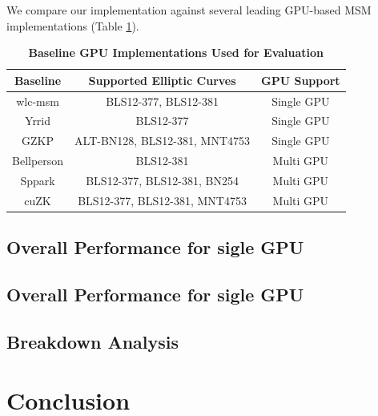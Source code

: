 \documentclass[journal=tches,final]{iacrtrans}
\begin{document}
We compare our implementation against several leading GPU-based MSM implementations (Table \ref{tab:baseline-gpu-implementations}).
\begin{table}[htbp]
    \caption{\textbf{Baseline GPU Implementations Used for Evaluation}} %
    \begin{center}
    \begin{tabular}{|c|c|c|}
    \hline
    \textbf{Baseline} & \textbf{Supported Elliptic Curves} & \textbf{GPU Support} \\
    \hline
    wlc-msm & BLS12-377, BLS12-381 & Single GPU \\
    \hline
    Yrrid & BLS12-377 & Single GPU \\
    \hline
    GZKP & ALT-BN128, BLS12-381, MNT4753 & Single GPU \\
    \hline
    Bellperson & BLS12-381 & Multi GPU \\
    \hline
    Sppark & BLS12-377, BLS12-381, BN254 & Multi GPU \\
    \hline
    cuZK & BLS12-377, BLS12-381, MNT4753 & Multi GPU \\
    \hline
    \end{tabular}
    \label{tab:baseline-gpu-implementations} %
    \end{center}
\end{table}


\subsection{Overall Performance for sigle GPU}
\todo{}

\subsection{Overall Performance for sigle GPU}
\todo{}

\subsection{Breakdown Analysis}
\todo{}
\section{Conclusion}
\todo{}

% 
% 
\end{document}
